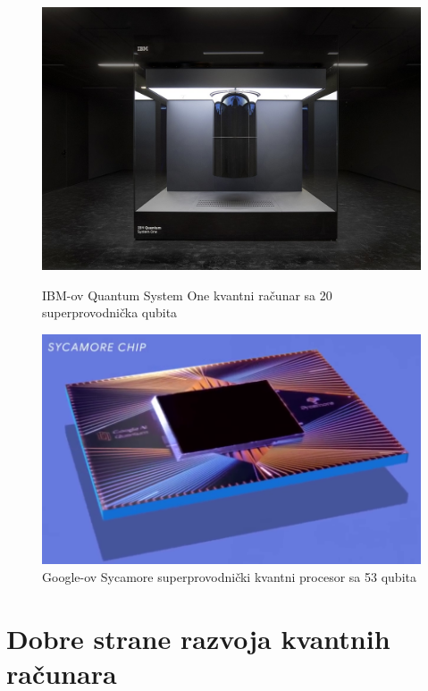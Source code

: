 \documentclass[fleqn, 12pt]{article}
\begin{document}
\begin{figure}[h!]
  \centering
  \begin{minipage}[b]{0.4\textwidth}
    \includegraphics[width=\textwidth]{IBM_Q_system_(Fraunhofer_2).jpg}
    \caption{IBM-ov Quantum System One kvantni računar sa 20 superprovodnička qubita}
  \end{minipage}
  \hfill
  \begin{minipage}[b]{0.4\textwidth}
    \includegraphics[width=\textwidth]{Google_Sycamore_Chip_002.png}
    \caption{Google-ov Sycamore superprovodnički kvantni procesor sa 53 qubita}
  \end{minipage}
\end{figure}

\newpage

\section{Dobre strane razvoja kvantnih računara}
\end{document}
